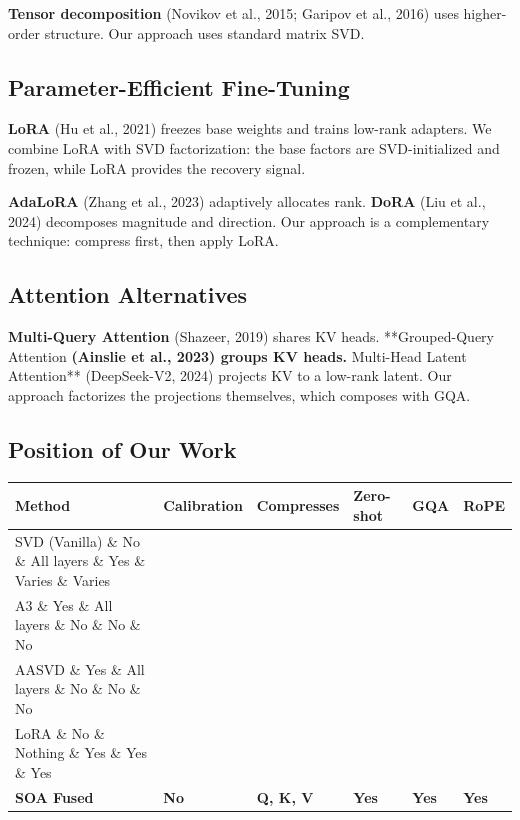 \textbf{Tensor decomposition} (Novikov et al., 2015; Garipov et al., 2016) uses 
higher-order structure. Our approach uses standard matrix SVD.

\subsection{Parameter-Efficient Fine-Tuning}

\textbf{LoRA} (Hu et al., 2021) freezes base weights and trains low-rank adapters. 
We combine LoRA with SVD factorization: the base factors are SVD-initialized 
and frozen, while LoRA provides the recovery signal.

\textbf{AdaLoRA} (Zhang et al., 2023) adaptively allocates rank. \textbf{DoRA} 
(Liu et al., 2024) decomposes magnitude and direction. Our approach is a 
complementary technique: compress first, then apply LoRA.

\subsection{Attention Alternatives}

\textbf{Multi-Query Attention} (Shazeer, 2019) shares KV heads. **Grouped-Query 
Attention\textbf{ (Ainslie et al., 2023) groups KV heads. }Multi-Head Latent 
Attention** (DeepSeek-V2, 2024) projects KV to a low-rank latent. Our 
approach factorizes the projections themselves, which composes with GQA.

\subsection{Position of Our Work}

\begin{table}[H]
\centering
\small
\begin{tabular}{llllll}
\toprule
\textbf{Method} & \textbf{Calibration} & \textbf{Compresses} & \textbf{Zero-shot} & \textbf{GQA} & \textbf{RoPE} \\
\midrule
SVD (Vanilla) \& No \& All layers \& Yes \& Varies \& Varies \\
A3 \& Yes \& All layers \& No \& No \& No \\
AASVD \& Yes \& All layers \& No \& No \& No \\
LoRA \& No \& Nothing \& Yes \& Yes \& Yes \\
\textbf{SOA Fused} & \textbf{No} & \textbf{Q, K, V} & \textbf{Yes} & \textbf{Yes} & \textbf{Yes} \\
\bottomrule
\end{tabular}
\end{table}

